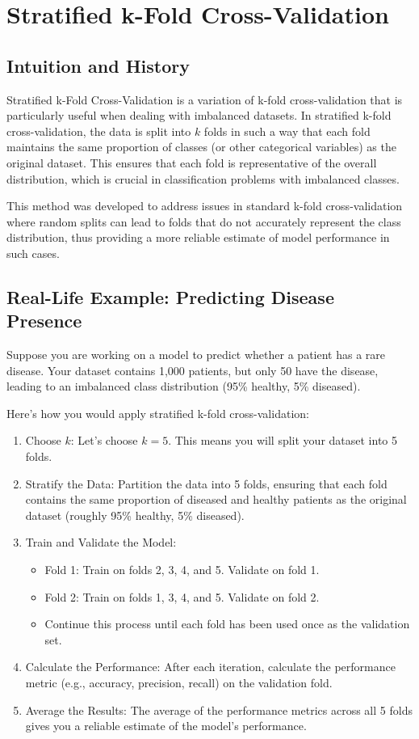 \documentclass[10pt]{article}
\begin{document}
\section{Stratified k-Fold Cross-Validation}
\subsection{Intuition and History}
Stratified k-Fold Cross-Validation is a variation of k-fold cross-validation that is particularly useful when dealing with imbalanced datasets. In stratified k-fold cross-validation, the data is split into \(k\) folds in such a way that each fold maintains the same proportion of classes (or other categorical variables) as the original dataset. This ensures that each fold is representative of the overall distribution, which is crucial in classification problems with imbalanced classes.

This method was developed to address issues in standard k-fold cross-validation where random splits can lead to folds that do not accurately represent the class distribution, thus providing a more reliable estimate of model performance in such cases.

\subsection{Real-Life Example: Predicting Disease Presence}
Suppose you are working on a model to predict whether a patient has a rare disease. Your dataset contains 1,000 patients, but only 50 have the disease, leading to an imbalanced class distribution (95\% healthy, 5\% diseased).

Here’s how you would apply stratified k-fold cross-validation:

\begin{enumerate}
    \item Choose \(k\): Let’s choose \(k=5\). This means you will split your dataset into 5 folds.
    \item Stratify the Data: Partition the data into 5 folds, ensuring that each fold contains the same proportion of diseased and healthy patients as the original dataset (roughly 95\% healthy, 5\% diseased).
    \item Train and Validate the Model:
    \begin{itemize}
        \item Fold 1: Train on folds 2, 3, 4, and 5. Validate on fold 1.
        \item Fold 2: Train on folds 1, 3, 4, and 5. Validate on fold 2.
        \item Continue this process until each fold has been used once as the validation set.
    \end{itemize}
    \item Calculate the Performance: After each iteration, calculate the performance metric (e.g., accuracy, precision, recall) on the validation fold.
    \item Average the Results: The average of the performance metrics across all 5 folds gives you a reliable estimate of the model’s performance.
\end{enumerate}
\end{document}
